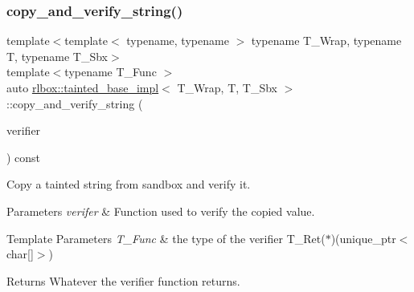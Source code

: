 \subsubsection{\texorpdfstring{copy\+\_\+and\+\_\+verify\+\_\+string()}{copy\_and\_verify\_string()}}
{\footnotesize\ttfamily template$<$template$<$ typename, typename $>$ typename T\+\_\+\+Wrap, typename T, typename T\+\_\+\+Sbx$>$ \\
template$<$typename T\+\_\+\+Func $>$ \\
auto \hyperlink{classrlbox_1_1tainted__base__impl}{rlbox\+::tainted\+\_\+base\+\_\+impl}$<$ T\+\_\+\+Wrap, T, T\+\_\+\+Sbx $>$\+::copy\+\_\+and\+\_\+verify\+\_\+string (\begin{DoxyParamCaption}\item[{T\+\_\+\+Func}]{verifier }\end{DoxyParamCaption}) const\hspace{0.3cm}{\ttfamily [inline]}}



Copy a tainted string from sandbox and verify it. 


\begin{DoxyParams}{Parameters}
{\em verifer} & Function used to verify the copied value. \\
\hline
\end{DoxyParams}

\begin{DoxyTemplParams}{Template Parameters}
{\em T\+\_\+\+Func} & the type of the verifier {\ttfamily T\+\_\+\+Ret($\ast$)(unique\+\_\+ptr$<$char\mbox{[}\mbox{]}$>$)} \\
\hline
\end{DoxyTemplParams}
\begin{DoxyReturn}{Returns}
Whatever the verifier function returns. 
\end{DoxyReturn}
\mbox{\label{classrlbox_1_1tainted__base__impl_ac7d2f71a8fc72b922bfa1260d4a7ac94}} 
